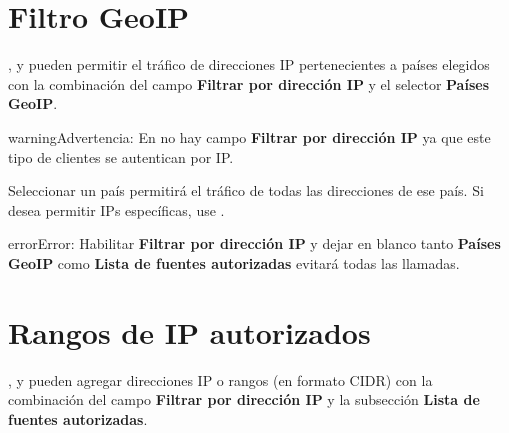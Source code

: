 \documentclass[letterpaper,10pt,spanish]{sphinxmanual}
\begin{document}
\section{Filtro GeoIP}
\label{security_and_maintenance/security/geoip_filter:geoip-filter}\label{security_and_maintenance/security/geoip_filter::doc}\label{security_and_maintenance/security/geoip_filter:id1}
{\hyperref[administration_portal/client/vpbx/index:vpbx\string-clients]{}}, {\hyperref[administration_portal/client/retail/index:retail\string-clients]{}} y {\hyperref[administration_portal/client/residential/index:residential\string-clients]{}} pueden permitir el tráfico de direcciones IP pertenecientes a países elegidos con la combinación del campo \textbf{Filtrar por dirección IP} y el selector \textbf{Países GeoIP}.

\begin{notice}{warning}{Advertencia:}
En {\hyperref[administration_portal/client/wholesale/index:wholesale\string-clients]{}} no hay campo \textbf{Filtrar por dirección IP} ya que este tipo de clientes se autentican por IP.
\end{notice}

Seleccionar un país permitirá el tráfico de todas las direcciones de ese país. Si desea permitir IPs específicas, use {\hyperref[security_and_maintenance/security/authorized_ip_ranges:client\string-authorized\string-ip\string-ranges]{}}.

\begin{notice}{error}{Error:}
Habilitar \textbf{Filtrar por dirección IP} y dejar en blanco tanto \textbf{Países GeoIP} como \textbf{Lista de fuentes autorizadas} evitará todas las llamadas.
\end{notice}
\label{security_and_maintenance/security/authorized_ip_ranges:client-authorized-ip-ranges}

\section{Rangos de IP autorizados}
\label{security_and_maintenance/security/authorized_ip_ranges:client-authorized-ip-ranges}\label{security_and_maintenance/security/authorized_ip_ranges::doc}\label{security_and_maintenance/security/authorized_ip_ranges:authorized-ip-ranges}\label{security_and_maintenance/security/authorized_ip_ranges:id1}
{\hyperref[administration_portal/client/vpbx/index:vpbx\string-clients]{}}, {\hyperref[administration_portal/client/retail/index:retail\string-clients]{}} y {\hyperref[administration_portal/client/residential/index:residential\string-clients]{}} pueden agregar direcciones IP o rangos (en formato CIDR) con la combinación del campo \textbf{Filtrar por dirección IP} y la subsección \textbf{Lista de fuentes autorizadas}.
\end{document}
